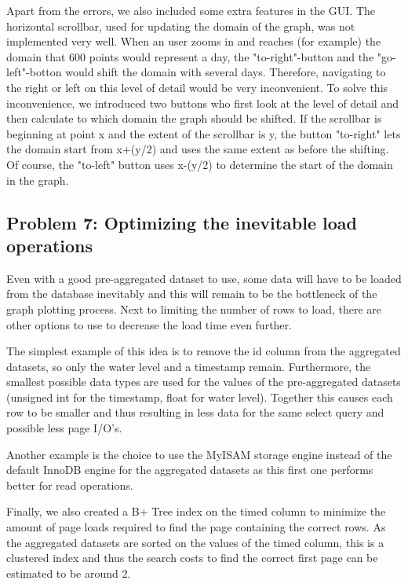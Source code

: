 Apart from the errors, we also included some extra features in the GUI. The horizontal scrollbar, used for updating the domain of the graph, was not implemented very well. When an user zooms in and reaches (for example) the domain that 600 points would represent a day, the "to-right"-button and the "go-left"-botton would shift the domain with several days. Therefore, navigating to the right or left on this level of detail would be very inconvenient.
To solve this inconvenience, we introduced two buttons who first look at the level of detail and then calculate to which domain the graph should be shifted. If the scrollbar is beginning at point x and the extent of the scrollbar is y, the button "to-right" lets the domain start from x+(y/2) and uses the same extent as before the shifting. Of course, the "to-left" button uses x-(y/2) to determine the start of the domain in the graph.

\subsection{Problem 7: Optimizing the inevitable load operations}
Even with a good pre-aggregated dataset to use, some data will have to be loaded from the database inevitably and this will remain to be the bottleneck of the graph plotting process. Next to limiting the number of rows to load, there are other options to use to decrease the load time even further. 

The simplest example of this idea is to remove the id column from the aggregated datasets, so only the water level and a timestamp remain. Furthermore, the smallest possible data types are used for the values of the pre-aggregated datasets (unsigned int for the timestamp, float for water level). Together this causes each row to be smaller and thus resulting in less data for the same select query and possible less page I/O's.

Another example is the choice to use the MyISAM storage engine instead of the default InnoDB engine for the aggregated datasets as this first one performs better for read operations.

Finally, we also created a B+ Tree index on the timed column to minimize the amount of page loads required to find the page containing the correct rows. As the aggregated datasets are sorted on the values of the timed column, this is a clustered index and thus the search costs to find the correct first page can be estimated to be around 2. 
